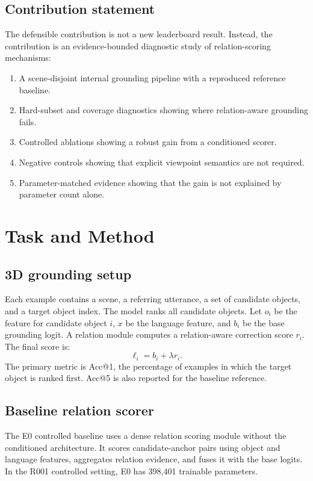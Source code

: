 \documentclass[11pt]{article}
\makeatletter
\newcommand{\acc}{Acc@1}
\newcommand{\acctopfive}{Acc@5}
\makeatother
\begin{document}
\subsection{Contribution statement}

The defensible contribution is not a new leaderboard result. Instead, the contribution is an evidence-bounded diagnostic study of relation-scoring mechanisms:
\begin{enumerate}
  \item A scene-disjoint internal grounding pipeline with a reproduced reference baseline.
  \item Hard-subset and coverage diagnostics showing where relation-aware grounding fails.
  \item Controlled ablations showing a robust gain from a conditioned scorer.
  \item Negative controls showing that explicit viewpoint semantics are not required.
  \item Parameter-matched evidence showing that the gain is not explained by parameter count alone.
\end{enumerate}

\section{Task and Method}

\subsection{3D grounding setup}

Each example contains a scene, a referring utterance, a set of candidate objects, and a target object index. The model ranks all candidate objects. Let $o_i$ be the feature for candidate object $i$, $x$ be the language feature, and $b_i$ be the base grounding logit. A relation module computes a relation-aware correction score $r_i$. The final score is:
\begin{equation}
  \ell_i = b_i + \lambda r_i .
\end{equation}
The primary metric is \acc{}, the percentage of examples in which the target object is ranked first. \acctopfive{} is also reported for the baseline reference.

\subsection{Baseline relation scorer}

The E0 controlled baseline uses a dense relation scoring module without the conditioned architecture. It scores candidate-anchor pairs using object and language features, aggregates relation evidence, and fuses it with the base logits. In the R001 controlled setting, E0 has 398,401 trainable parameters.
\end{document}
